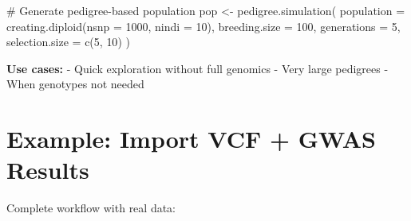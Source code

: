\documentclass[
  letterpaper,
]{book}
\newenvironment{Shaded}{\begin{snugshade}}{\end{snugshade}}
\newcommand{\AttributeTok}[1]{\textcolor[rgb]{0.40,0.45,0.13}{#1}}
\newcommand{\CommentTok}[1]{\textcolor[rgb]{0.37,0.37,0.37}{#1}}
\newcommand{\DecValTok}[1]{\textcolor[rgb]{0.68,0.00,0.00}{#1}}
\newcommand{\FunctionTok}[1]{\textcolor[rgb]{0.28,0.35,0.67}{#1}}
\newcommand{\NormalTok}[1]{\textcolor[rgb]{0.00,0.23,0.31}{#1}}
\newcommand{\OtherTok}[1]{\textcolor[rgb]{0.00,0.23,0.31}{#1}}
\begin{document}
\begin{Shaded}
\begin{Highlighting}[]
\CommentTok{\# Generate pedigree{-}based population}
\NormalTok{pop }\OtherTok{\textless{}{-}} \FunctionTok{pedigree.simulation}\NormalTok{(}
  \AttributeTok{population =} \FunctionTok{creating.diploid}\NormalTok{(}\AttributeTok{nsnp =} \DecValTok{1000}\NormalTok{, }\AttributeTok{nindi =} \DecValTok{10}\NormalTok{),}
  \AttributeTok{breeding.size =} \DecValTok{100}\NormalTok{,}
  \AttributeTok{generations =} \DecValTok{5}\NormalTok{,}
  \AttributeTok{selection.size =} \FunctionTok{c}\NormalTok{(}\DecValTok{5}\NormalTok{, }\DecValTok{10}\NormalTok{)}
\NormalTok{)}
\end{Highlighting}
\end{Shaded}

\textbf{Use cases:} - Quick exploration without full genomics - Very
large pedigrees - When genotypes not needed

\section{Example: Import VCF + GWAS Results}\label{sec-example-vcf-gwas}

Complete workflow with real data:
\end{document}
